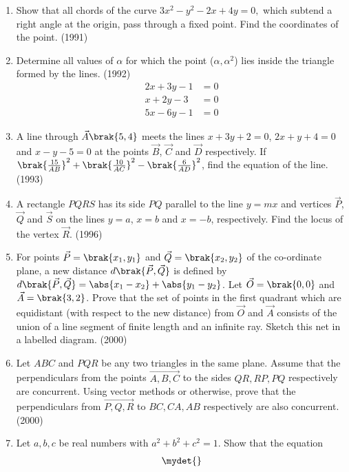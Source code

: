 \begin{enumerate}[label=\thesubsection.\arabic*.,ref=\thesubsection.\theenumi]
\begin{center}
\end{center}
%	
\item Show that all chords of  the curve $ 3x^2-y^2-2x+4y=0,$ which subtend a right angle at the origin, pass through a fixed point. Find the coordinates of the point.     \hfill{(1991)}
%
\item Determine all values of $\alpha$ for which the point ($\alpha , \alpha^2$) lies inside the triangle formed by the lines.  \hfill{(1992)}
	\begin{align*}  2x+3y-1&=0\\ 
	x+2y-3&=0  \\ 5x-6y-1&=0   \end{align*}
%
\item A line through $\vec{A} \brak{5, 4}$ meets the lines $x+3y+2=0$, $2x+y+4=0$ and $x-y-5=0$ at the points $\vec{B}$, $\vec{C}$ and $\vec{D}$ respectively. If $\brak{\frac{15}{AB}}^{2}+\brak{\frac{10}{AC}}^{2}-\brak{\frac{6}{AD}}^{2}$, find the equation of the line.
	\hfill{(1993)}
%
\item A rectangle $PQRS$ has its side $PQ$ parallel to the line $y=mx$ 
	and vertices $\vec{P}$, $\vec{Q}$ and $\vec{S}$ on the lines $y=a$, $x=b$ and $x=-b$, 
		respectively. Find the locus of the vertex $\vec{R}$.
		\hfill{(1996)}
%
\item For points $\vec{P}=\brak{x_{1}, y_{1}}$ and $\vec{Q}=\brak{x_{2}, y_{2}}$ of the co-ordinate plane, a new distance $d\brak{\vec{P}, \vec{Q}}$ is defined by $d\brak{\vec{P}, \vec{Q}}=\abs{x_{1}-x_{2}}+\abs{y_{1}-y_{2}}$. Let $\vec{O}=\brak{0, 0}$ and $\vec{A}=\brak{3, 2}$. Prove that the set of points in the first quadrant which are equidistant (with respect to the new distance) from $\vec{O}$ and $\vec{A}$ consists of the union of a line segment of finite length and an infinite ray. Sketch this net in a labelled diagram.
	\hfill{(2000)}
%
\item Let $ABC$ and $PQR$ be any two triangles in the same plane.
	Assume that the perpendiculars from the points $\vec{A, B, C}$ to 
		the sides $QR, RP, PQ$ respectively are concurrent. Using vector methods or otherwise, prove that the perpendiculars from $\vec{P, Q, R}$ to $BC, CA, AB$ respectively are also concurrent. 
	\hfill{(2000)}
%
\item Let $a, b, c$ be real numbers with $a^{2}+b^{2}+c^{2}=1$. Show that the equation 
	\begin{align*}
		\mydet{
}
\end{align*}
\end{enumerate}
